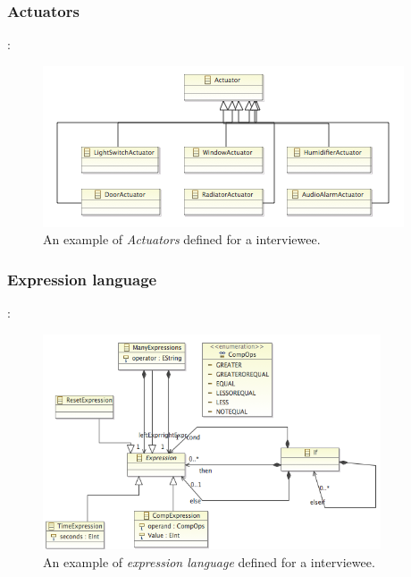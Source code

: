 \documentclass{llncs}
\begin{document}
\pagebreak
\subsubsection{Actuators}:
\begin{figure}
	\centering
    \includegraphics[scale=0.7]{ecore-actuators.png}   
	\caption{An example of \textit{Actuators} defined for a interviewee.}
	\label{fig:ecore-actuators}
\end{figure}

\subsubsection{Expression language}:
\begin{figure}
  \centering
    \includegraphics[width=10cm]{ecore-expression-language.png} 
	\caption{An example of \textit{expression language} defined for a interviewee.}
	\label{fig:ecore-expression-language}
\end{figure}

\pagebreak
\end{document}

